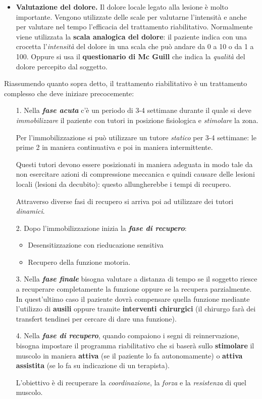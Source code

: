 \begin{itemize}
\item
  \textbf{Valutazione del dolore.} Il dolore locale legato alla lesione
  è molto importante. Vengono utilizzate delle scale per valutarne
  l'intensità e anche per valutare nel tempo l'efficacia del trattamento
  riabilitativo. Normalmente viene utilizzata la \textbf{scala analogica
  del dolore}: il paziente indica con una crocetta l'\emph{intensità}
  del dolore in una scala che può andare da 0 a 10 o da 1 a 100. Oppure
  si usa il \textbf{questionario di Mc Guill} che indica la
  \emph{qualità} del dolore percepito dal soggetto.
\end{itemize}

Riassumendo quanto sopra detto, il trattamento riabilitativo è un
trattamento complesso che deve iniziare precocemente:

\begin{itemize}
\item[1.]
  Nella \textbf{\emph{fase acuta}} c'è un periodo di 3-4 settimane
  durante il quale si deve \emph{immobilizzare} il paziente con tutori
  in posizione fisiologica e \emph{stimolare} la zona.

Per l'immobilizzazione si può utilizzare un tutore \emph{statico} per
3-4 settimane: le prime 2 in maniera continuativa e poi in maniera
intermittente.

Questi tutori devono essere posizionati in maniera adeguata in modo tale
da non esercitare azioni di compressione meccanica e quindi causare
delle lesioni locali (lesioni da decubito): questo allungherebbe i tempi
di recupero.

Attraverso diverse fasi di recupero si arriva poi ad utilizzare dei
tutori \emph{dinamici}.

\item[2.]
  Dopo l'immobilizzazione inizia la \textbf{\emph{fase di recupero}}:
\begin{itemize}
\item
  Desensitizzazione con rieducazione sensitiva
\item
  Recupero della funzione motoria.
  \end{itemize}
\item[3.]
  Nella \textbf{\emph{fase finale}} bisogna valutare a distanza di tempo
  se il soggetto riesce a recuperare completamente la funzione oppure se
  la recupera parzialmente. In quest'ultimo caso il paziente dovrà
  compensare quella funzione mediante l'utilizzo di \textbf{ausili}
  oppure tramite \textbf{interventi chirurgici} (il chirurgo farà dei
  transfert tendinei per cercare di dare una funzione).

\item[4.] Nella \textbf{\emph{fase di recupero}}, quando compaiono i segni di
reinnervazione, bisogna impostare il programma riabilitativo che si
baserà sullo \textbf{stimolare} il muscolo in maniera \textbf{attiva}
(se il paziente lo fa autonomamente) o \textbf{attiva assistita} (se lo
fa su indicazione di un terapista).

L'obiettivo è di recuperare la \emph{coordinazione}, la \emph{forza} e
la \emph{resistenza} di quel muscolo.
\end{itemize}

